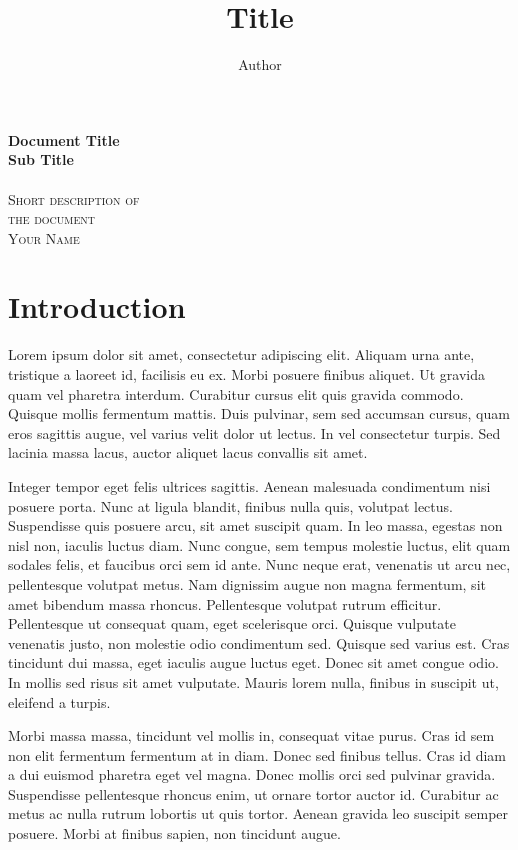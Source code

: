 \documentclass[12pt,a4paper]{article}
\title{ Title }
\author{ Author }
\begin{document}
\begin{center}
    \huge{\textbf{ Document Title }} \\
    \huge{\textbf{ Sub Title }}\\
    \hspace{200pt}\\
    \textsc{ Short description of } \\
    \textsc{ the document }
    \vspace{280pt}\\
    \textsc{ Your Name }
\end{center}

\newpage
\tableofcontents
\newpage

\section{Introduction}



Lorem ipsum dolor sit amet, consectetur adipiscing elit. Aliquam urna ante, tristique a laoreet id, facilisis eu ex. Morbi posuere finibus aliquet. Ut gravida quam vel pharetra interdum. Curabitur cursus elit quis gravida commodo. Quisque mollis fermentum mattis. Duis pulvinar, sem sed accumsan cursus, quam eros sagittis augue, vel varius velit dolor ut lectus. In vel consectetur turpis. Sed lacinia massa lacus, auctor aliquet lacus convallis sit amet.

Integer tempor eget felis ultrices sagittis. Aenean malesuada condimentum nisi posuere porta. Nunc at ligula blandit, finibus nulla quis, volutpat lectus. Suspendisse quis posuere arcu, sit amet suscipit quam. In leo massa, egestas non nisl non, iaculis luctus diam. Nunc congue, sem tempus molestie luctus, elit quam sodales felis, et faucibus orci sem id ante. Nunc neque erat, venenatis ut arcu nec, pellentesque volutpat metus. Nam dignissim augue non magna fermentum, sit amet bibendum massa rhoncus. Pellentesque volutpat rutrum efficitur. Pellentesque ut consequat quam, eget scelerisque orci. Quisque vulputate venenatis justo, non molestie odio condimentum sed. Quisque sed varius est. Cras tincidunt dui massa, eget iaculis augue luctus eget. Donec sit amet congue odio. In mollis sed risus sit amet vulputate. Mauris lorem nulla, finibus in suscipit ut, eleifend a turpis.

Morbi massa massa, tincidunt vel mollis in, consequat vitae purus. Cras id sem non elit fermentum fermentum at in diam. Donec sed finibus tellus. Cras id diam a dui euismod pharetra eget vel magna. Donec mollis orci sed pulvinar gravida. Suspendisse pellentesque rhoncus enim, ut ornare tortor auctor id. Curabitur ac metus ac nulla rutrum lobortis ut quis tortor. Aenean gravida leo suscipit semper posuere. Morbi at finibus sapien, non tincidunt augue.
\end{document}
